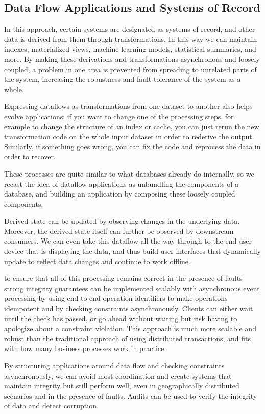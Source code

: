 \documentclass{article}
\begin{document}
    \subsection{Data Flow Applications and Systems of Record }
    In this approach, certain systems are designated as systems of record, and other data is derived from them through transformations. In this way we can maintain indexes, materialized views, machine learning models, statistical summaries, and more. By making these derivations and transformations asynchronous and loosely coupled, a problem in one area is prevented from spreading to unrelated parts of the system, increasing the robustness and fault-tolerance of the system as a whole.

    Expressing dataflows as transformations from one dataset to another also helps evolve applications: if you want to change one of the processing steps, for example to change the structure of an index or cache, you can just rerun the new transformation code on the whole input dataset in order to rederive the output. Similarly, if something goes wrong, you can fix the code and reprocess the data in order to recover.

    These processes are quite similar to what databases already do internally, so we recast the idea of dataflow applications as unbundling the components of a database, and building an application by composing these loosely coupled components.

    Derived state can be updated by observing changes in the underlying data. Moreover, the derived state itself can further be observed by downstream consumers. We can even take this dataflow all the way through to the end-user device that is displaying the data, and thus build user interfaces that dynamically update to reflect data changes and continue to work offline.
    
    to ensure that all of this processing remains correct in the presence of faults strong integrity guarantees can be implemented scalably with asynchronous event processing by using end-to-end operation identifiers to make operations idempotent and by checking constraints asynchronously. Clients can either wait until the check has passed, or go ahead without waiting but risk having to apologize about a constraint violation. This approach is much more scalable and robust than the traditional approach of using distributed transactions, and fits with how many business processes work in practice.
    
    By structuring applications around data flow and checking constraints asynchronously, we can avoid most coordination and create systems that maintain integrity but still perform well, even in geographically distributed scenarios and in the presence of faults. Audits can be used to verify the integrity of data and detect corruption.
\end{document}
